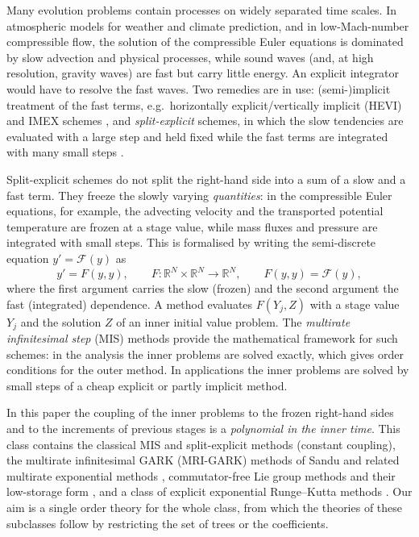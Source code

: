 \documentclass[11pt,a4paper]{article}
\theoremstyle{definition}
\theoremstyle{remark}
\newcommand{\R}{\mathbb{R}}
\begin{document}
Many evolution problems contain processes on widely separated time scales. In atmospheric models for weather and
climate prediction, and in low-Mach-number compressible flow, the solution of the compressible Euler equations is
dominated by slow advection and physical processes, while sound waves (and, at high resolution, gravity waves) are fast
but carry little energy. An explicit integrator would have to resolve the fast waves. Two remedies are in use:
(semi-)implicit treatment of the fast terms, e.g.\ horizontally explicit/vertically implicit (HEVI) and IMEX schemes
\cite{GiraldoKellyConstantinescu2013,BoscarinoFilbetRusso2016}, and \emph{split-explicit} schemes, in which the slow
tendencies are evaluated with a large step and held fixed while the fast terms are integrated with many small steps
\cite{KlempWilhelmson1978,WickerSkamarock2002,KlempSkamarockDudhia2007,Baldauf2010}.

Split-explicit schemes do not split the right-hand side into a sum of a slow and a fast term. They freeze the slowly
varying \emph{quantities}: in the compressible Euler equations, for example, the advecting velocity and the transported
potential temperature are frozen at a stage value, while mass fluxes and pressure are integrated with small steps. This
is formalised by writing the semi-discrete equation $y'=\mathcal F(y)$ as
\begin{equation}\label{eq:G}
y'=F(y,y),\qquad F:\R^N\times\R^N\to\R^N,\qquad F(y,y)=\mathcal F(y), \tag{$\mathcal G$}
\end{equation}
where the first argument carries the slow (frozen) and the second argument the fast (integrated) dependence. A method
evaluates $F(Y_j,Z)$ with a stage value $Y_j$ and the solution $Z$ of an inner initial value problem. The
\emph{multirate infinitesimal step} (MIS) methods \cite{KnothWolke1998,WenschKnothGalant2009,KnothWensch2014}
provide the mathematical framework for such schemes: in the analysis the inner problems are solved exactly, which
gives order conditions for the outer method. In applications the inner problems are solved by small steps of a cheap
explicit or partly implicit method.

In this paper the coupling of the inner problems to the frozen right-hand sides and to the increments of previous stages
is a \emph{polynomial in the inner time}. This class contains the classical MIS and split-explicit methods (constant
coupling), the multirate infinitesimal GARK (MRI-GARK) methods of Sandu \cite{Sandu2019} and related multirate
exponential methods \cite{LuanChinomonaReynolds2020,ChinomonaReynolds2021}, commutator-free Lie group methods
\cite{CelledoniMarthinsenOwren2003,Owren2006} and their low-storage form \cite{Bazavov2022}, and a class of explicit
exponential Runge--Kutta methods \cite{HochbruckOstermann2005,HochbruckOstermann2010}. Our aim is a single order theory for the
whole class, from which the theories of these subclasses follow by restricting the set of trees or the coefficients.
\end{document}
